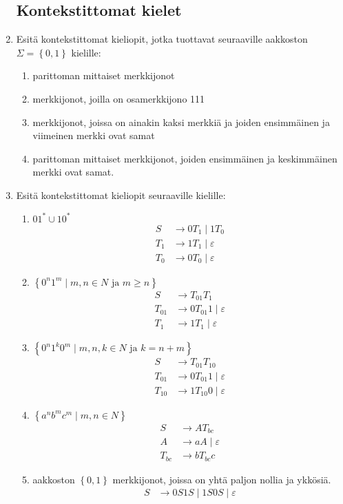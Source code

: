 \documentclass[a4paper,11pt]{article}
\newcommand{\set}[1]{{\left\{ #1 \right\}}}
\begin{document}
\begin{enumerate}
\subsection*{Kontekstittomat kielet}
\item
Esitä kontekstittomat kieliopit, jotka tuottavat seuraaville
aakkoston $\Sigma=\set{0,1}$ kielille:
\begin{enumerate}
\item
parittoman mittaiset merkkijonot
\item
merkkijonot, joilla on osamerkkijono 111
\item
merkkijonot, joissa on ainakin kaksi merkkiä ja joiden
ensimmäinen ja viimeinen merkki ovat samat
\item
parittoman mittaiset merkkijonot, joiden ensimmäinen ja
keskimmäinen merkki ovat samat.
\end{enumerate}

\item
Esitä kontekstittomat  kieliopit seuraaville kielille:
\begin{enumerate}
\item $01^\ast\cup10^\ast$
  \begin{align*}
    S   & \to 0T_1 \mid 1T_0 \\
    T_1 & \to 1T_1 \mid \varepsilon \\
    T_0 & \to 0T_0 \mid \varepsilon
  \end{align*}
\item $\set{0^n1^m\mid\mbox{$m,n\in N$ ja $m\geq n$}}$
  \begin{align*}
    S      & \to T_{01} T_1 \\
    T_{01} & \to 0T_{01}1 \mid \varepsilon \\
    T_{1}  & \to 1T_1 \mid \varepsilon
  \end{align*}
\item $\set{0^n1^k0^m\mid\mbox{$m,n,k\in N$ ja $k=n+m$}}$
  \begin{align*}
    S & \to T_{01} T_{10} \\
    T_{01} & \to 0T_{01}1 \mid \varepsilon \\
    T_{10} & \to 1T_{10}0 \mid \varepsilon
  \end{align*}
\item $\set{a^n b^m c^m\mid m,n\in N}$
  \begin{align*}
    S & \to AT_{bc} \\
    A & \to aA \mid \varepsilon \\
    T_{bc} & \to bT_{bc}c
  \end{align*}
\item
  aakkoston $\set{0,1}$ merkkijonot, joissa on yhtä paljon nollia ja
  ykkösiä.
  \begin{align*}
    S & \to 0S1S \mid 1S0S \mid \varepsilon
  \end{align*}
\end{enumerate}



\end{enumerate}
\end{document}
